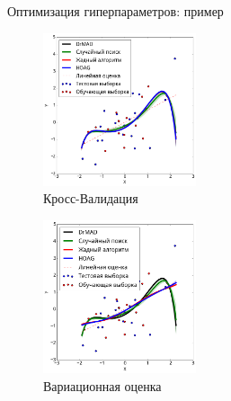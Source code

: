 \documentclass[usenames,dvipsnames,11pt,pdf,utf8,russian,aspectratio=43]{beamer}
\begin{document}
\begin{frame}{Оптимизация гиперпараметров: пример}
\begin{multicols}{2}
\begin{figure}[h]
\includegraphics[width=0.4\textwidth]{./slide_plots/poly_cv.png}
\caption*{Кросс-Валидация}
\end{figure}

\begin{figure}[h]
\includegraphics[width=0.4\textwidth]{./slide_plots/poly_var.png}
\caption*{Вариационная оценка}
\end{figure}
\end{multicols}

\end{frame}
\end{document}

